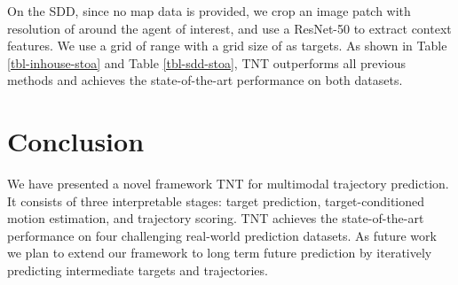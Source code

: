 \documentclass{article}
\newcommand{\model}{TNT\xspace}
\begin{document}
On the SDD, since no map data is provided, we crop an image patch with resolution of  around the agent of interest, and use a ResNet-50 to extract context features. We use a grid of range  with a grid size of  as targets.
As shown in Table \ref{tbl-inhouse-stoa} and Table \ref{tbl-sdd-stoa}, TNT outperforms all previous methods and achieves the state-of-the-art performance on both datasets. \section{Conclusion}
We have presented a novel framework \model for multimodal trajectory prediction. It consists of three interpretable stages: target prediction, target-conditioned motion estimation, and trajectory scoring. \model achieves the state-of-the-art performance on four challenging real-world prediction datasets. As future work  we plan to  extend our framework to long term future prediction by iteratively predicting intermediate targets and trajectories. 




\clearpage
\end{document}
